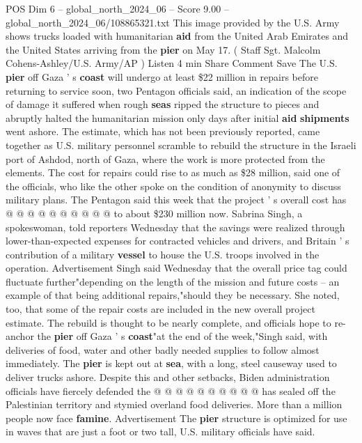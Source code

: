 \begin{textsample}{POS Dim 6 – global\_north\_2024\_06 – Score 9.00 – global\_north\_2024\_06/108865321.txt}  \label{ex:f6_pos_133}
This image provided by the U.S.
Army shows trucks loaded with humanitarian \textbf{aid} from the United Arab Emirates and the United States arriving from the \textbf{pier} on May 17. ( Staff Sgt.
Malcolm Cohens-Ashley/U.S.
Army/AP ) Listen 4 min Share Comment Save The U.S. \textbf{pier} off Gaza ' s \textbf{coast} will undergo at least \$22 million in repairs before returning to service soon, two Pentagon officials said, an indication of the scope of damage it suffered when rough \textbf{seas} ripped the structure to pieces and abruptly halted the humanitarian mission only days after initial \textbf{aid} \textbf{shipments} went ashore.
The estimate, which has not been previously reported, came together as U.S. military personnel scramble to rebuild the structure in the Israeli port of Ashdod, north of Gaza, where the work is more protected from the elements.
The cost for repairs could rise to as much as \$28 million, said one of the officials, who like the other spoke on the condition of anonymity to discuss military plans.
The Pentagon said this week that the project ' s overall cost has @ @ @ @ @ @ @ @ @ @ to about \$230 million now.
Sabrina Singh, a spokeswoman, told reporters Wednesday that the savings were realized through lower-than-expected expenses for contracted vehicles and drivers, and Britain ' s contribution of a military \textbf{vessel} to house the U.S. troops involved in the operation.
Advertisement Singh said Wednesday that the overall price tag could fluctuate further"depending on the length of the mission and future costs -- an example of that being additional repairs,"should they be necessary.
She noted, too, that some of the repair costs are included in the new overall project estimate.
The rebuild is thought to be nearly complete, and officials hope to re-anchor the \textbf{pier} off Gaza ' s \textbf{coast}"at the end of the week,"Singh said, with deliveries of food, water and other badly needed supplies to follow almost immediately.
The \textbf{pier} is kept out at \textbf{sea}, with a long, steel causeway used to deliver trucks ashore.
Despite this and other setbacks, Biden administration officials have fiercely defended the @ @ @ @ @ @ @ @ @ @ has sealed off the Palestinian territory and stymied overland food deliveries.
More than a million people now face \textbf{famine}.
Advertisement The \textbf{pier} structure is optimized for use in waves that are just a foot or two tall, U.S. military officials have said.

\end{textsample}
